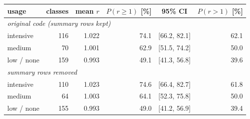 \begin{tabular}{lrrrcr}
\toprule
usage & classes & mean $r$ & $P(r \ge 1)$ [\%] & 95\% CI & $P(r > 1)$ [\%] \\
\midrule
\multicolumn{6}{l}{\emph{original code (summary rows kept)}} \\
\quad intensive & 116 & 1.022 & 74.1 & [66.2, 82.1] & 62.1 \\
\quad medium & 70 & 1.001 & 62.9 & [51.5, 74.2] & 50.0 \\
\quad low / none & 159 & 0.993 & 49.1 & [41.3, 56.8] & 39.6 \\
\multicolumn{6}{l}{\emph{summary rows removed}} \\
\quad intensive & 110 & 1.023 & 74.6 & [66.4, 82.7] & 61.8 \\
\quad medium & 64 & 1.003 & 64.1 & [52.3, 75.8] & 50.0 \\
\quad low / none & 155 & 0.993 & 49.0 & [41.2, 56.9] & 39.4 \\
\bottomrule
\end{tabular}
